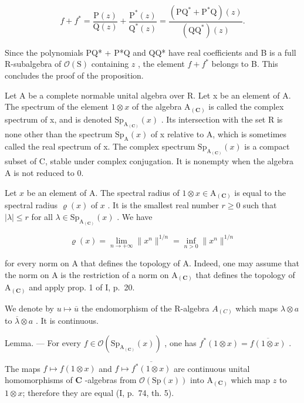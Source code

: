 \[
f + f ^ {*} = \frac {\mathrm{P} (z)}{\mathrm{Q} (z)} + \frac {\mathrm{P} ^ {*} (z)}{\mathrm{Q} ^ {*} (z)} = \frac {(\mathrm{PQ} ^ {*} + \mathrm{P} ^ {*} \mathrm{Q}) (z)}{(\mathrm{QQ} ^ {*}) (z)}.
\]

Since the polynomials PQ* + P*Q and QQ* have real coefficients and B is a full R-subalgebra of \(\mathcal{O}(\mathrm{S})\) containing \(z\) , the element \(f + f^{*}\) belongs to B. This concludes the proof of the proposition.

Let A be a complete normable unital algebra over R. Let x be an element of A. The spectrum of the element \(1 \otimes x\) of the algebra \(\mathrm{A}_{(\mathbf{C})}\) is called the complex spectrum of x, and is denoted \(\mathrm{Sp}_{\mathrm{A}_{(\mathbf{C})}}(x)\) . Its intersection with the set R is none other than the spectrum \(\mathrm{Sp}_{\mathrm{A}}(x)\) of x relative to A, which is sometimes called the real spectrum of x. The complex spectrum \(\mathrm{Sp}_{\mathrm{A}_{(\mathbf{C})}}(x)\) is a compact subset of C, stable under complex conjugation. It is nonempty when the algebra A is not reduced to 0.

Let \(x\) be an element of A. The spectral radius of \(1 \otimes x \in \mathrm{A}_{(\mathbf{C})}\) is equal to the spectral radius \(\varrho(x)\) of \(x\) . It is the smallest real number \(r \geqslant 0\) such that \(|\lambda| \leqslant r\) for all \(\lambda \in \mathrm{Sp}_{\mathrm{A}_{(\mathbf{C})}}(x)\) . We have

\[
\varrho (x) = \lim _ {n \to + \infty} \| x ^ {n} \| ^ {1 / n} = \inf _ {n > 0} \| x ^ {n} \| ^ {1 / n}
\]

for every norm on A that defines the topology of A. Indeed, one may assume that the norm on A is the restriction of a norm on \(\mathrm{A}_{(\mathbf{C})}\) that defines the topology of \(\mathrm{A}_{(\mathbf{C})}\) and apply prop. 1 of I, p.~20.

We denote by \(u \mapsto \overline{u}\) the endomorphism of the R-algebra \(A_{(C)}\) which maps \(\lambda \otimes a\) to \(\overline{\lambda} \otimes a\) . It is continuous.

Lemma. --- For every \(f \in \mathcal{O}(\mathrm{Sp}_{\mathrm{A}_{(\mathbf{C})}}(x))\) , one has \(f^{*}(1 \otimes x) = \overline{f(1 \otimes x)}\) .

The maps \(f \mapsto f(1 \otimes x)\) and \(f \mapsto \overline{f^*(1 \otimes x)}\) are continuous unital homomorphisms of \(\mathbf{C}\) -algebras from \(\mathcal{O}(\mathrm{Sp}(x))\) into \(\mathrm{A}_{(\mathbf{C})}\) which map \(z\) to \(1 \otimes x\); therefore they are equal (I, p.~74, th. 5).

